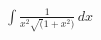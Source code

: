 \documentclass[preview]{standalone}
\begin{document}
\begin{align*}
\int \frac{1}{x^2\sqrt(1+x^2)} \, dx
\end{align*}
\end{document}
